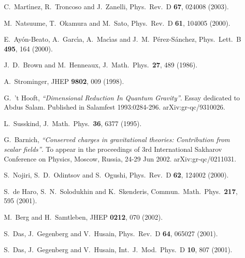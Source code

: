 \documentclass[a4paper,12pt]{article}
\begin{document}
\begin{thebibliography}{99}
  C.~Mart\'{\i }nez, R.~Troncoso and J.~Zanelli, 
Phys.\ Rev.\ D {\bf 67}, 024008 (2003).


  M.~Natsuume, T.~Okamura and M.~Sato, 
Phys.\ Rev.\ D \textbf{61}, 104005 (2000). 


  E.~Ay\'on-Beato, A.~Garc\'{\i }a, A.~Mac\'{\i }as and
J.~M.~P\'erez-S\'anchez, 
Phys.\ Lett.\ B \textbf{495}, 164 (2000). 

  J.~D.~Brown and M.~Henneaux, 
J.\ Math.\ Phys.\ \textbf{27}, 489 (1986). 


  A.~Strominger, 
JHEP \textbf{9802}, 009 (1998). 


  G.~'t Hooft, 
{\it ``Dimensional Reduction In Quantum Gravity''}.
Essay dedicated to Abdus Salam. 
Published in Salamfest 1993:0284-296. 
arXiv:gr-qc/9310026. 


  L.~Susskind, %
J.\ Math.\ Phys.\ \textbf{36}, 6377 (1995). 


  G.~Barnich, 
{\it ``Conserved charges in gravitational theories: Contribution from scalar  fields''}.
To appear in the proceedings of 3rd International Sakharov 
Conference on Physics, Moscow, Russia, 24-29 Jun 2002. 
arXiv:gr-qc/0211031. 


  S.~Nojiri, S.~D.~Odintsov and S.~Ogushi, 
Phys.\ Rev.\ D \textbf{62}, 124002 (2000). 

S.~de Haro, S.~N.~Solodukhin and K.~Skenderis,
Commun.\ Math.\ Phys.\  {\bf 217}, 595 (2001).

M.~Berg and H.~Samtleben,
JHEP {\bf 0212}, 070 (2002).


  S.~Das, J.~Gegenberg and V.~Husain, 
Phys.\ Rev.\ D \textbf{64}, 065027 (2001). 


  S.~Das, J.~Gegenberg and V.~Husain, 
Int.\ J.\ Mod.\ Phys.\ D \textbf{10}, 807 (2001). 
\end{thebibliography}
\end{document}
